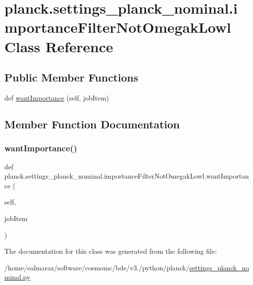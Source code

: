 \hypertarget{classplanck_1_1settings__planck__nominal_1_1importanceFilterNotOmegakLowl}{}\section{planck.\+settings\+\_\+planck\+\_\+nominal.\+importance\+Filter\+Not\+Omegak\+Lowl Class Reference}
\label{classplanck_1_1settings__planck__nominal_1_1importanceFilterNotOmegakLowl}
\subsection*{Public Member Functions}
\begin{DoxyCompactItemize}
\item 
def \mbox{\hyperlink{classplanck_1_1settings__planck__nominal_1_1importanceFilterNotOmegakLowl_ab69cbdc5355c8fadb7325bd340674dcd}{want\+Importance}} (self, job\+Item)
\end{DoxyCompactItemize}


\subsection{Member Function Documentation}
\mbox{\label{classplanck_1_1settings__planck__nominal_1_1importanceFilterNotOmegakLowl_ab69cbdc5355c8fadb7325bd340674dcd}} 
\subsubsection{\texorpdfstring{want\+Importance()}{wantImportance()}}
{\footnotesize\ttfamily def planck.\+settings\+\_\+planck\+\_\+nominal.\+importance\+Filter\+Not\+Omegak\+Lowl.\+want\+Importance (\begin{DoxyParamCaption}\item[{}]{self,  }\item[{}]{job\+Item }\end{DoxyParamCaption})}



The documentation for this class was generated from the following file\+:\begin{DoxyCompactItemize}
\item 
/home/ealmaraz/software/cosmomc/bde/v3./python/planck/\mbox{\hyperlink{settings__planck__nominal_8py}{settings\+\_\+planck\+\_\+nominal.\+py}}\end{DoxyCompactItemize}
